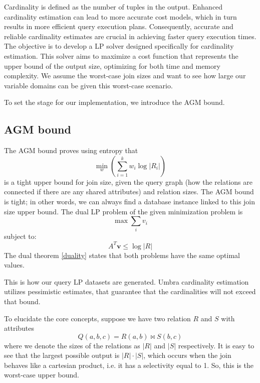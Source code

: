 Cardinality is defined as the number of tuples in the output.
Enhanced cardinality estimation
can lead to more accurate cost models, which in turn results
in more efficient query execution plans.
Consequently, accurate and reliable cardinality estimates are
crucial in achieving faster query execution times.
The objective is to develop a LP
solver designed specifically for cardinality estimation.
This solver aims to maximize a cost function that represents
the upper bound of the output size, optimizing for both
time and memory complexity.
We assume the worst-case join sizes and want to see how large our variable domains
can be given this worst-case scenario.

To set the stage for our implementation, we introduce the AGM bound.

\subsection{AGM bound}
The AGM bound \parencite{atserias2013size} proves
using entropy that \[ \min_w \left( \sum_{i=1}^{k} w_i \log |R_i| \right) \]
is a tight upper bound for join size, given the query graph (how the
relations are connected if there are any shared attributes)
and relation sizes. The AGM bound is tight; in other words, we can always find
a database instance linked to this join size upper bound.
The dual LP problem of the given minimization problem is
\[ \max \sum_{i} v_i \]
subject to:
\[ A^T \mathbf{v} \leq \log |R| \]
The dual theorem \ref{duality} states that both problems have the same
optimal values.

This is how our query LP datasets are generated.
Umbra cardinality estimation utilizes pessimistic estimates, that guarantee that the cardinalities will not exceed that bound.

To elucidate the core concepts,
suppose we have two relation $R$ and $S$ with attributes
\[
    Q(a, b, c) = R(a, b) \Join S(b, c)
\]
where we denote the sizes of the relations as
$|R|$ and $|S|$ respectively.
It is easy to see that the largest possible output is $|R| \cdot |S|$, which occurs when the join
behaves like a cartesian product, i.e. it has a selectivity equal to 1. So, this is the worst-case
upper bound.

